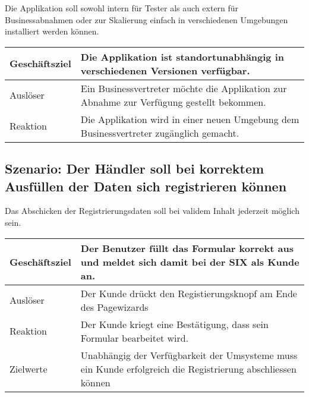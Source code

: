 Die Applikation soll sowohl intern für Tester als auch extern für Businessabnahmen oder zur Skalierung einfach in verschiedenen Umgebungen installiert werden können.

\begin{table}[H]
	\centering
	\begin{tabular}{ | p{3cm} | p{11cm} | }
		\toprule
		Geschäftsziel & Die Applikation ist standortunabhängig in verschiedenen Versionen verfügbar. \\ \hline
		Auslöser & Ein Businessvertreter möchte die Applikation zur Abnahme zur Verfügung gestellt bekommen. \\ \hline
		Reaktion & Die Applikation wird in einer neuen Umgebung dem Businessvertreter zugänglich gemacht. \\ 
		\bottomrule
	\end{tabular}
\end{table}

\subsection{Szenario: Der Händler soll bei korrektem Ausfüllen der Daten sich registrieren können}

Das Abschicken der Registrierungsdaten soll bei validem Inhalt jederzeit möglich sein.

\begin{table}[H]
	\centering
	\begin{tabular}{ | p{3cm} | p{11cm} | }
		\toprule
		Geschäftsziel & Der Benutzer füllt das Formular korrekt aus und meldet sich damit bei der SIX als Kunde an. \\ \hline
		Auslöser & Der Kunde drückt den Registierungsknopf am Ende des Pagewizards \\  \hline
		Reaktion & Der Kunde kriegt eine Bestätigung, dass sein Formular bearbeitet wird. \\ \hline
		Zielwerte & Unabhängig der Verfügbarkeit der Umsysteme muss ein Kunde erfolgreich die Registrierung abschliessen können \\
		\bottomrule
	\end{tabular}
\end{table}